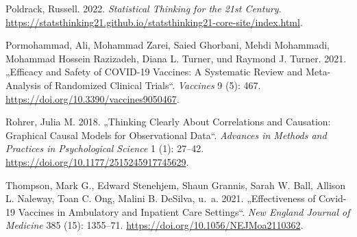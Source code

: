 \documentclass[
  a4paper,
  DIV=11]{scrreprt}
\newlength{\cslhangindent}
\newlength{\cslentryspacingunit} %
\newenvironment{CSLReferences}[2] %
 {%
  \setlength{\parindent}{0pt}
  \ifodd #1
  \let\oldpar\par
  \def\par{\hangindent=\cslhangindent\oldpar}
  \fi
  \setlength{\parskip}{#2\cslentryspacingunit}
 }%
 {}
\theoremstyle{definition}
\theoremstyle{remark}
\begin{document}
\begin{CSLReferences}{1}{0}
\leavevmode{}%
Poldrack, Russell. 2022. \emph{Statistical Thinking for the 21st
Century}.
\url{https://statsthinking21.github.io/statsthinking21-core-site/index.html}.

\leavevmode{}%
Pormohammad, Ali, Mohammad Zarei, Saied Ghorbani, Mehdi Mohammadi,
Mohammad Hossein Razizadeh, Diana L. Turner, und Raymond J. Turner.
2021. {„Efficacy and Safety of {COVID}-19 Vaccines: A Systematic Review
and Meta-Analysis of Randomized Clinical Trials``}. \emph{Vaccines} 9
(5): 467. \url{https://doi.org/10.3390/vaccines9050467}.

\leavevmode{}%
Rohrer, Julia M. 2018. {„Thinking Clearly About Correlations and
Causation: Graphical Causal Models for Observational Data``}.
\emph{Advances in Methods and Practices in Psychological Science} 1 (1):
27--42. \url{https://doi.org/10.1177/2515245917745629}.

\leavevmode{}%
Thompson, Mark G., Edward Stenehjem, Shaun Grannis, Sarah W. Ball,
Allison L. Naleway, Toan C. Ong, Malini B. DeSilva, u.~a. 2021.
{„Effectiveness of Covid-19 Vaccines in Ambulatory and Inpatient Care
Settings``}. \emph{New England Journal of Medicine} 385 (15): 1355--71.
\url{https://doi.org/10.1056/NEJMoa2110362}.

\end{CSLReferences}
\end{document}
